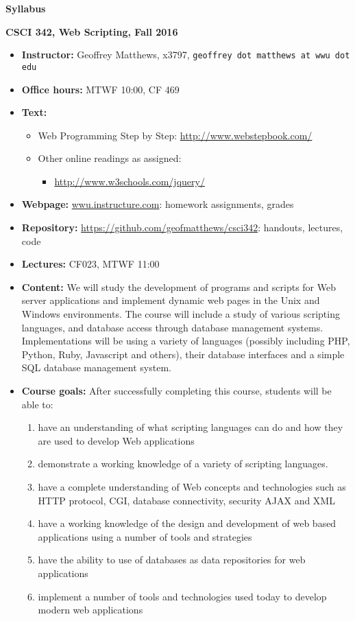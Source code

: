 \documentclass{article}
\begin{document}
\centerline{\large \bf Syllabus}

\centerline{\bf CSCI 342, Web Scripting, Fall 2016}

\begin{itemize}

\item
{\bf Instructor:} Geoffrey Matthews, x3797, {\tt  geoffrey dot matthews at wwu dot edu}
\item
{\bf Office hours:} MTWF 10:00, CF 469
\item
{\bf Text:} \begin{itemize}\item
Web Programming Step by Step: \url{http://www.webstepbook.com/}
\item
  Other online readings as assigned:
  \begin{itemize}
\item \url{http://www.w3schools.com/jquery/}
    \end{itemize}
\end{itemize}
\item {\bf Webpage:}  \url{wwu.instructure.com}:  homework assignments, grades
\item {\bf Repository:} \url{https://github.com/geofmatthews/csci342}:  handouts, lectures, code
\item
{\bf Lectures:} 
CF023, MTWF 11:00

\item
{\bf Content:} We will study the development of programs and scripts
for Web server applications and implement dynamic web pages in the
Unix and Windows environments.  The course will include a study of
various scripting languages, and database access through database
management systems.  Implementations will be using a variety of
languages (possibly including PHP, Python, Ruby, Javascript and
others), their database interfaces and a simple SQL database
management system.

\item {\bf Course goals:}  After successfully completing this course,
  students will be able to:
  \begin{enumerate}
    \item have an understanding of what scripting languages can do and
      how they are used to develop Web applications
    \item
      demonstrate a
      working knowledge of a variety of scripting languages.
    \item
      have a complete understanding of
      Web concepts and technologies such as HTTP protocol, CGI,
      database connectivity, security AJAX and XML
    \item have a working
      knowledge of the design and development of web based
      applications using a number of tools and strategies
    \item have the
      ability to use of databases as data repositories for web
      applications
    \item implement a number of tools and technologies
      used today to develop modern web applications
  \end{enumerate}
  


\end{itemize}
\end{document}
